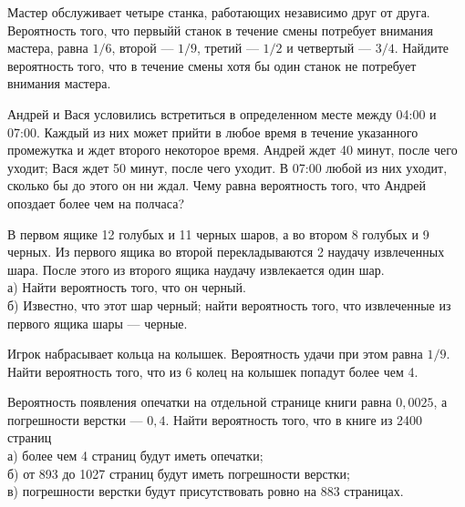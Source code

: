 \newpage\setcounter{zad}{0}



\begin{zkrW}{20}\noindent 
	Мастер обслуживает четыре станка, работающих независимо друг от друга. Вероятность того, что первыйй станок в течение смены потребует внимания мастера, равна $1/6$, второй --- $1/9$, третий --- $1/2$ и четвертый --- $3/4$. Найдите вероятность того, что в течение смены хотя бы один станок не потребует внимания мастера.
 
\end{zkrW}

\begin{zkrW}{20}\noindent 
	Андрей и Вася условились встретиться в определенном месте между 04:00 и 07:00. Каждый из них может прийти в любое время в течение указанного промежутка и ждет второго некоторое время. Андрей ждет 40 минут, после чего уходит; Вася ждет 50 минут, после чего уходит. В 07:00 любой из них уходит, сколько бы до этого он ни ждал. Чему равна вероятность того, что Андрей опоздает более чем на полчаса?
 
\end{zkrW}

\begin{zkrW}{20}\noindent 
	В первом ящике 12 голубых и 11 черных шаров, а во втором 8 голубых и 9 черных. Из первого ящика во второй перекладываются 2 наудачу извлеченных шара. После этого из второго ящика наудачу извлекается один шар. \\ \indent а) Найти вероятность того, что он черный. \\ \indent б) Известно, что этот шар черный; найти вероятность того, что извлеченные из первого ящика шары --- черные.
 
\end{zkrW}

\begin{zkrW}{20}\noindent 
	Игрок набрасывает кольца на колышек. Вероятность удачи при этом равна $1/9$. Найти вероятность того, что из 6 колец на колышек попадут более чем 4.
 
\end{zkrW}

\begin{zkrW}{20}\noindent 
	Вероятность появления опечатки на отдельной странице книги равна $0{,}0025$, а погрешности верстки --- $0{,}4$. Найти вероятность того, что в книге из 2400 страниц \\ \indent а) более чем 4 страниц будут иметь опечатки; \\ \indent б) от 893 до 1027 страниц будут иметь погрешности верстки; \\ \indent в) погрешности верстки будут присутствовать ровно на 883 страницах.
 
\end{zkrW}

